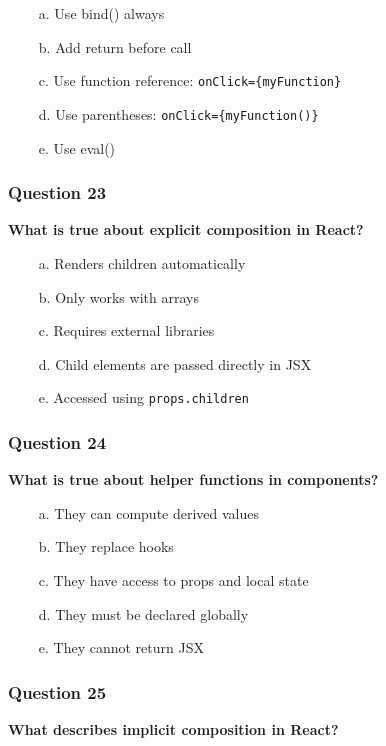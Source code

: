 \documentclass{article}
\newcommand{\cmark}{\textcolor{green}{\ding{51}}} %
\newcommand{\xmark}{\textcolor{red}{\ding{55}}}   %
\begin{document}
\begin{itemize}
  \item[\xmark\ a.] Use bind() always
  \item[\xmark\ b.] Add return before call
  \item[\cmark\ c.] Use function reference: \texttt{onClick=\{myFunction\}}
  \item[\xmark\ d.] Use parentheses: \texttt{onClick=\{myFunction()\}}
  \item[\xmark\ e.] Use eval()
\end{itemize}

\subsubsection*{Question 23}
\textbf{What is true about explicit composition in React?}

\begin{itemize}
  \item[\xmark\ a.] Renders children automatically
  \item[\xmark\ b.] Only works with arrays
  \item[\xmark\ c.] Requires external libraries
  \item[\cmark\ d.] Child elements are passed directly in JSX
  \item[\cmark\ e.] Accessed using \texttt{props.children}
\end{itemize}

\subsubsection*{Question 24}
\textbf{What is true about helper functions in components?}

\begin{itemize}
  \item[\cmark\ a.] They can compute derived values
  \item[\xmark\ b.] They replace hooks
  \item[\cmark\ c.] They have access to props and local state
  \item[\xmark\ d.] They must be declared globally
  \item[\xmark\ e.] They cannot return JSX
\end{itemize}

\subsubsection*{Question 25}
\textbf{What describes implicit composition in React?}
\end{document}

